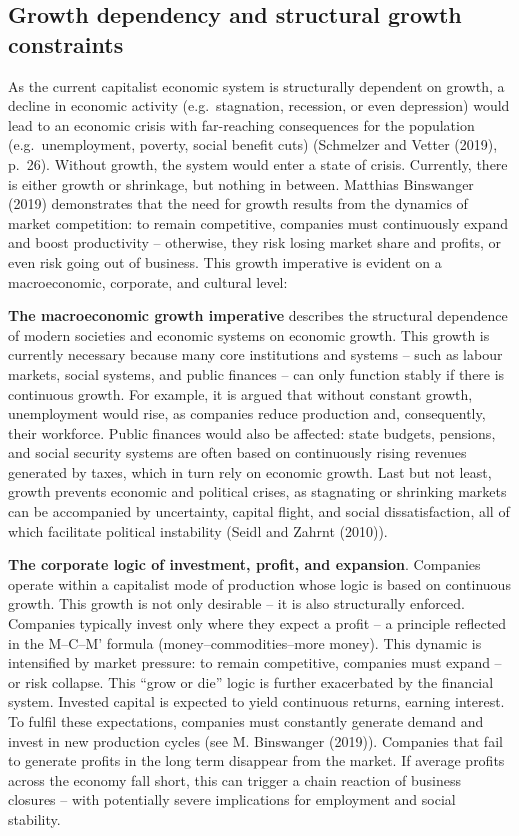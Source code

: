 \documentclass[
  a4paper,
  openany]{book}
\begin{document}
\subsection{Growth dependency and structural growth
constraints}\label{growth-dependency-and-structural-growth-constraints}

As the current capitalist economic system is structurally dependent on
growth, a decline in economic activity (e.g.~stagnation, recession, or
even depression) would lead to an economic crisis with far-reaching
consequences for the population (e.g.~unemployment, poverty, social
benefit cuts) (Schmelzer and Vetter (2019), p.~26). Without growth, the
system would enter a state of crisis. Currently, there is either growth
or shrinkage, but nothing in between. Matthias Binswanger (2019)
demonstrates that the need for growth results from the dynamics of
market competition: to remain competitive, companies must continuously
expand and boost productivity -- otherwise, they risk losing market
share and profits, or even risk going out of business. This growth
imperative is evident on a macroeconomic, corporate, and cultural level:

\textbf{The macroeconomic growth imperative} describes the structural
dependence of modern societies and economic systems on economic growth.
This growth is currently necessary because many core institutions and
systems -- such as labour markets, social systems, and public finances
-- can only function stably if there is continuous growth. For example,
it is argued that without constant growth, unemployment would rise, as
companies reduce production and, consequently, their workforce. Public
finances would also be affected: state budgets, pensions, and social
security systems are often based on continuously rising revenues
generated by taxes, which in turn rely on economic growth. Last but not
least, growth prevents economic and political crises, as stagnating or
shrinking markets can be accompanied by uncertainty, capital flight, and
social dissatisfaction, all of which facilitate political instability
(Seidl and Zahrnt (2010)).

\textbf{The corporate logic of investment, profit, and expansion}.
Companies operate within a capitalist mode of production whose logic is
based on continuous growth. This growth is not only desirable -- it is
also structurally enforced. Companies typically invest only where they
expect a profit -- a principle reflected in the M--C--M' formula
(money--commodities--more money). This dynamic is intensified by market
pressure: to remain competitive, companies must expand -- or risk
collapse. This ``grow or die'' logic is further exacerbated by the
financial system. Invested capital is expected to yield continuous
returns, earning interest. To fulfil these expectations, companies must
constantly generate demand and invest in new production cycles (see M.
Binswanger (2019)). Companies that fail to generate profits in the long
term disappear from the market. If average profits across the economy
fall short, this can trigger a chain reaction of business closures --
with potentially severe implications for employment and social
stability.
\end{document}
